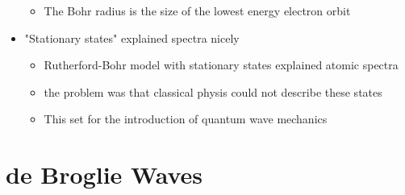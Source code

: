 \documentclass[12pt]{article}
\begin{document}
\begin{itemize}
\begin{itemize}
        \item The Bohr radius is the size of the lowest energy electron orbit
    \end{itemize}
    \item "Stationary states" explained spectra nicely \begin{itemize}
        \item Rutherford-Bohr model with stationary states explained atomic spectra
        \item the problem was that classical physis could not describe these states
        \item This set for the introduction of quantum wave mechanics
    \end{itemize}

\end{itemize}
\section {de Broglie Waves}
\end{document}
